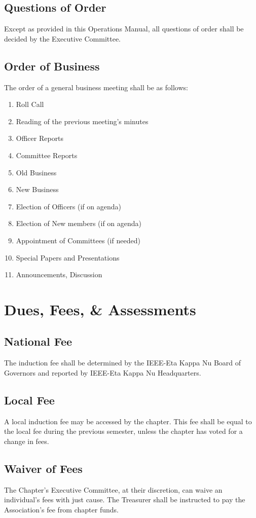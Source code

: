 \documentclass[10pt, oneside]{article}
\begin{document}
\subsection{Questions of Order}
Except as provided in this Operations Manual, all questions of order shall be decided by the Executive Committee.
\subsection{Order of Business}
The order of a general business meeting shall be as follows:
\begin{enumerate}[label=\alph*.]
\item Roll Call
\item Reading of the previous meeting’s minutes
\item Officer Reports
\item Committee Reports
\item Old Business
\item New Business
\item Election of Officers (if on agenda)
\item Election of New members (if on agenda)
\item Appointment of Committees (if needed)
\item Special Papers and Presentations
\item Announcements, Discussion
\end{enumerate}

\section{Dues, Fees, \& Assessments}
\subsection{National Fee}
The induction fee shall be determined by the IEEE-Eta Kappa Nu Board of Governors and reported by IEEE-Eta Kappa Nu Headquarters.
\subsection{Local Fee}
A local induction fee may be accessed by the chapter. This fee shall be equal to the local fee during the previous semester, unless the chapter has voted for a change in fees.
\subsection{Waiver of Fees}
The Chapter’s Executive Committee, at their discretion, can waive an individual’s fees with just cause. The Treasurer shall be instructed to pay the Association’s fee from chapter funds.
\end{document}
